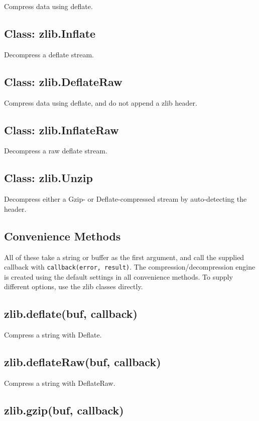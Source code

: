 Compress data using deflate.

\subsection{Class: zlib.Inflate}

Decompress a deflate stream.

\subsection{Class: zlib.DeflateRaw}

Compress data using deflate, and do not append a zlib header.

\subsection{Class: zlib.InflateRaw}

Decompress a raw deflate stream.

\subsection{Class: zlib.Unzip}

Decompress either a Gzip- or Deflate-compressed stream by auto-detecting
the header.

\subsection{Convenience Methods}

All of these take a string or buffer as the first argument, and call the
supplied callback with \texttt{callback(error, result)}. The
compression/decompression engine is created using the default settings
in all convenience methods. To supply different options, use the zlib
classes directly.

\subsection{zlib.deflate(buf, callback)}

Compress a string with Deflate.

\subsection{zlib.deflateRaw(buf, callback)}

Compress a string with DeflateRaw.

\subsection{zlib.gzip(buf, callback)}

